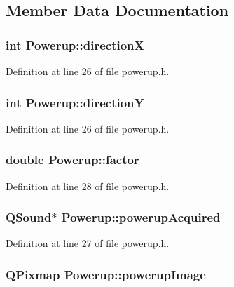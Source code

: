 \subsection{Member Data Documentation}
\hypertarget{class_powerup_a5fb53c57a23b61e7d59696eadb9fe7db}{
\subsubsection[{directionX}]{\setlength{\rightskip}{0pt plus 5cm}int {\bf Powerup::directionX}}}
\label{class_powerup_a5fb53c57a23b61e7d59696eadb9fe7db}


Definition at line 26 of file powerup.h.\hypertarget{class_powerup_a2169993d2e076f75b3c236bebc71ab4f}{
\subsubsection[{directionY}]{\setlength{\rightskip}{0pt plus 5cm}int {\bf Powerup::directionY}}}
\label{class_powerup_a2169993d2e076f75b3c236bebc71ab4f}


Definition at line 26 of file powerup.h.\hypertarget{class_powerup_a6a5cf33586c92ef4fbd950f108d36ed9}{
\subsubsection[{factor}]{\setlength{\rightskip}{0pt plus 5cm}double {\bf Powerup::factor}}}
\label{class_powerup_a6a5cf33586c92ef4fbd950f108d36ed9}


Definition at line 28 of file powerup.h.\hypertarget{class_powerup_ab5346fff1db496ccf866d51aa30b34fa}{
\subsubsection[{powerupAcquired}]{\setlength{\rightskip}{0pt plus 5cm}QSound$\ast$ {\bf Powerup::powerupAcquired}}}
\label{class_powerup_ab5346fff1db496ccf866d51aa30b34fa}


Definition at line 27 of file powerup.h.\hypertarget{class_powerup_aefad56fdb8d34e9ebda24ffcaff19364}{
\subsubsection[{powerupImage}]{\setlength{\rightskip}{0pt plus 5cm}QPixmap {\bf Powerup::powerupImage}}}
\label{class_powerup_aefad56fdb8d34e9ebda24ffcaff19364}


